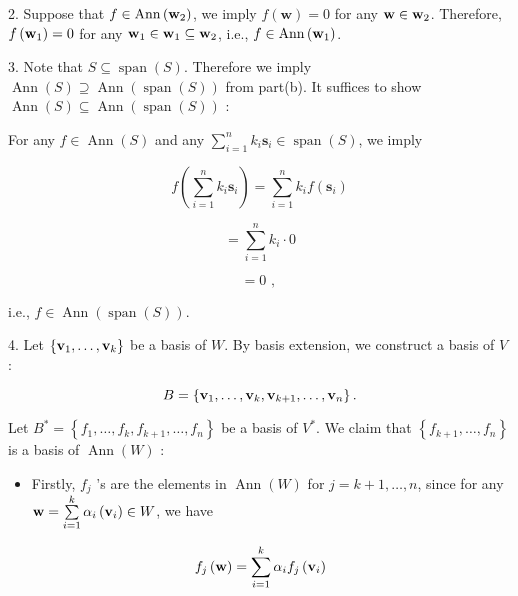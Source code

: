 \documentclass[11pt]{article}
\begin{document}
2. Suppose that \(f \in  \operatorname{Ann}\left( {\bf w}_2\right)\), we imply \(f\left( \mathbf{w}\right)  = 0\) for any \(\mathbf{w} \in  {\bf w}_2\). Therefore, \(f\left( {\bf w}_1\right)  = 0\) for any \({\bf w}_1 \in  {\bf w}_1 \subseteq  {\bf w}_2\), i.e., \(f \in  \operatorname{Ann}\left( {\bf w}_1\right)\).

3. Note that \(S \subseteq  \operatorname{span}\left( S\right)\). Therefore we imply \(\operatorname{Ann}\left( S\right)  \supseteq  \operatorname{Ann}\left( {\operatorname{span}\left( S\right) }\right)\) from part(b). It suffices to show \(\operatorname{Ann}\left( S\right)  \subseteq  \operatorname{Ann}\left( {\operatorname{span}\left( S\right) }\right)\) :

For any \(f \in  \operatorname{Ann}\left( S\right)\) and any \(\mathop{\sum }\limits_{{i = 1}}^n{k}_{i}{\mathbf{s}}_{i} \in  \operatorname{span}\left( S\right)\), we imply

\[
f\left( {\mathop{\sum }\limits_{{i = 1}}^n{k}_{i}{\mathbf{s}}_{i}}\right)  = \mathop{\sum }\limits_{{i = 1}}^n{k}_{i}f\left( {\mathbf{s}}_{i}\right)
\]

\[
= \mathop{\sum }\limits_{{i = 1}}^n{k}_{i} \cdot  0
\]

\[
= 0\text{ , }
\]

i.e., \(f \in  \operatorname{Ann}\left( {\operatorname{span}\left( S\right) }\right)\).

4. Let \(\left\{  {{\bf v}_1,\ldots ,{\bf v}_{k}}\right\}\) be a basis of \(W\). By basis extension, we construct a basis of \(V\) :

\[
B = \left\{  {{\bf v}_1,\ldots ,{\bf v}_{k},{\bf v}_{k + 1},\ldots ,{\bf v}_n}\right\}  .
\]

Let \({B}^{ * } = \left\{  {{f}_1,\ldots ,{f}_{k},{f}_{k + 1},\ldots ,{f}_n}\right\}\) be a basis of \({V}^{ * }\). We claim that \(\left\{  {{f}_{k + 1},\ldots ,{f}_n}\right\}\) is a basis of \(\operatorname{Ann}\left( W\right)\) :

\begin{itemize}
\item Firstly, \({f}_{j}\) ’s are the elements in \(\operatorname{Ann}\left( W\right)\) for \(j = k + 1,\ldots ,n\), since for any \(\mathbf{w} = \mathop{\sum }\limits_{{i = 1}}^{k}\alpha_{i}\left( {\bf v}_{i}\right)  \in  W\), we have
\end{itemize}

\[
{f}_{j}\left( \mathbf{w}\right)  = \mathop{\sum }\limits_{{i = 1}}^{k}\alpha_{i}{f}_{j}\left( {\bf v}_{i}\right)
\]
\end{document}
